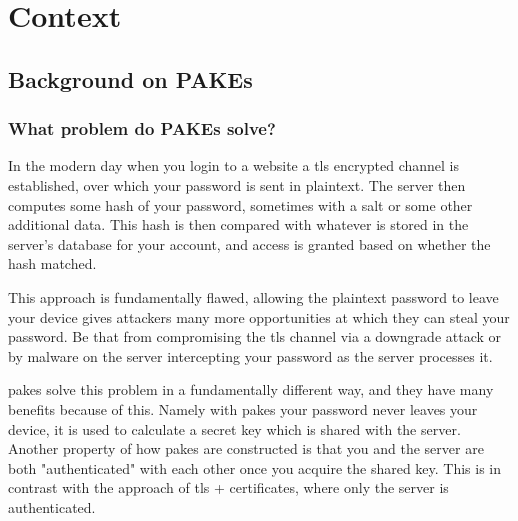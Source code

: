 \chapter{Context}
\section{Background on PAKEs}
\subsection{What problem do PAKEs solve?}
In the modern day when you login to a website a \gls{tls} encrypted channel is established, over which your password is sent in plaintext.
The server then computes some hash of your password, sometimes with a salt or some other additional data.
This hash is then compared with whatever is stored in the server's database for your account, and access is granted based on whether the hash matched.

This approach is fundamentally flawed, allowing the plaintext password to leave your device gives attackers many more opportunities at which they can steal your password.
Be that from compromising the \gls{tls} channel via a downgrade attack or by malware on the server intercepting your password as the server processes it.

\glspl{pake} solve this problem in a fundamentally different way, and they have many benefits because of this.
Namely with \glspl{pake} your password never leaves your device, it is used to calculate a secret key which is shared with the server.
Another property of how \glspl{pake} are constructed is that you and the server are both "authenticated" with each other once you acquire the shared key.
This is in contrast with the approach of \gls{tls} + certificates, where only the server is authenticated.

